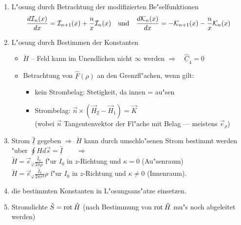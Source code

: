 \begin{enumerate}
\begin{itemize}
         {\bf L"osungsansatz:} $\underline{\hat{F}}(\rho)=\underline{\hat{C}}_3
         +\underline{\hat{C}}_4 \ln\left(\frac{\rho}{R}\right)$
   \end{itemize}
\item L"osung durch Betrachtung der modifizierten Be"selfunktionen
      $$\frac{d{\cal I}_n(x)}{dx}={\cal I}_{n+1}(x)+\frac{n}{x}{\cal I}_n(x)
      \quad {\rm und} \quad
      \frac{d{\cal K}_n(x)}{dx}=-{\cal K}_{n+1}(x)-\frac{n}{x}{\cal K}_n(x)$$
\item L"osung durch Bestimmen der Konstanten
    \begin{itemize}
    \item $\check{H}$ -- Feld kann im Unendlichen nicht $\infty$ werden
          $\Rightarrow\quad \underline{\hat{C}}_4 =0$
    \item Betrachtung von $\underline{\hat{F}}(\rho)$ an den Grenzfl"achen, wenn
          gilt:
          \begin{itemize}
          \item kein Strombelag: Stetigkeit, da innen = au"sen
          \item Strombelag: $\vec{n}\times(\vec{H}_2-\vec{H}_1)=\vec{K}$\\ (wobei
                $\vec{n}$ Tangentenvektor der Fl"ache mit Belag --- meistens
                $\vec{e}_{\rho}$)
          \end{itemize}
    \end{itemize}
\item Strom $\underline{\hat{I}}$ gegeben $\Rightarrow$  $\check{H}$ kann durch
      umschlo"senen Strom bestimmt werden "uber
      $\oint Hd\vec{s}=\underline{\hat{I}}\qquad \Rightarrow$\\
      $\check{H}=\vec{e}_{\varphi}\frac{\hat{I}_0}{2\pi\rho}$ f"ur $I_0$ in
      $z$-Richtung und $\kappa=0$ (Au"senraum)\\
      $\check{H}=\vec{e}_{\varphi}\frac{\hat{I}_0}{2\pi r^2}\rho$ f"ur $I_0$ in
      $z$-Richtung und $\kappa\not=0$ (Innenraum).
\item die bestimmten Konstanten in L"osungsans"atze einsetzen.
\item Stromdichte $\check{S} = {\rm rot \:}\check{H}$ (nach Bestimmung von
      ${\rm rot \:}\check{H}$ mu"s noch abgeleitet werden)

\end{enumerate}

